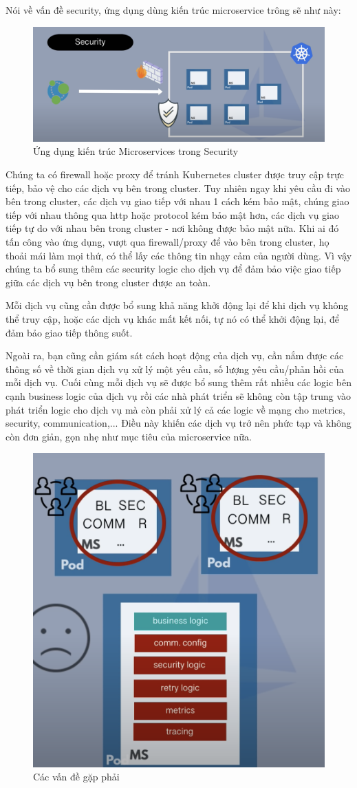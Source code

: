 \documentclass[12pt,a4paper]{report}
\begin{document}
		\newpage Nói về vấn đề security, ứng dụng dùng kiến trúc microservice trông sẽ như này:
		\begin{figure}[h]
			\centering
			\includegraphics[width=0.7\linewidth]{Pics/2.1.1-p1}
			\caption{Ứng dụng kiến trúc Microservices trong Security}
			\label{fig:2.1.1-1}
		\end{figure}
		
		Chúng ta có firewall hoặc proxy để tránh Kubernetes cluster được truy cập trực tiếp, bảo vệ cho các dịch vụ bên trong cluster. Tuy nhiên ngay khi yêu cầu đi vào bên trong cluster, các dịch vụ giao tiếp với nhau 1 cách kém bảo mật, chúng giao tiếp với nhau thông qua http hoặc protocol kém bảo mật hơn, các dịch vụ giao tiếp tự do với nhau bên trong cluster - nơi không được bảo mật nữa. Khi ai đó tấn công vào ứng dụng, vượt qua firewall/proxy để vào bên trong cluster, họ thoải mái làm mọi thứ, có thể lấy các thông tin nhạy cảm của người dùng. Vì vậy chúng ta bổ sung thêm các security logic cho dịch vụ để đảm bảo việc giao tiếp giữa các dịch vụ bên trong cluster được an toàn.
		
		Mỗi dịch vụ cũng cần được bổ sung khả năng khởi động lại để khi dịch vụ không thể truy cập, hoặc các dịch vụ khác mất kết nối, tự nó có thể khởi động lại, để đảm bảo giao tiếp thông suốt.
		
		Ngoài ra, bạn cũng cần giám sát cách hoạt động của dịch vụ, cần nắm được các thông số về thời gian dịch vụ xử lý một yêu cầu, số lượng yêu cầu/phản hồi của mỗi dịch vụ. Cuối cùng mỗi dịch vụ sẽ được bổ sung thêm rất nhiều các logic bên cạnh business logic của dịch vụ rồi các nhà phát triển sẽ không còn tập trung vào phát triển logic cho dịch vụ mà còn phải xử lý cả các logic về mạng cho metrics, security, communication,... Điều này khiến các dịch vụ trở nên phức tạp và không còn đơn giản, gọn nhẹ như mục tiêu của microservice nữa.
		\begin{figure}[h]
			\centering
			\includegraphics[width=0.48\linewidth]{Pics/2.1.1-p2}
			\caption{Các vấn đề gặp phải}
			\label{fig:2.1.1-2}
		\end{figure}
		
\end{document}
